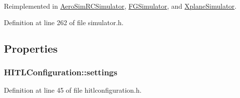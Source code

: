 \-Reimplemented in \hyperlink{group___h_i_t_l_plugin_gae47d5533f13e5ad9a6095ba2bc61bade}{\-Aero\-Sim\-R\-C\-Simulator}, \hyperlink{group___h_i_t_l_plugin_ga704da6f44b2b3538b2e1c3239cb2a76c}{\-F\-G\-Simulator}, and \hyperlink{group___h_i_t_l_plugin_ga3818193fd63bfaf004e3aab25491f28c}{\-Xplane\-Simulator}.



\-Definition at line 262 of file simulator.\-h.



\subsection{\-Properties}
\hypertarget{group___h_i_t_l_plugin_ga961f33f3db5f79daaf792a4999ac5c06}{
\subsubsection[{settings}]{ {\bf \-H\-I\-T\-L\-Configuration\-::settings}}}\label{group___h_i_t_l_plugin_ga961f33f3db5f79daaf792a4999ac5c06}


\-Definition at line 45 of file hitlconfiguration.\-h.


